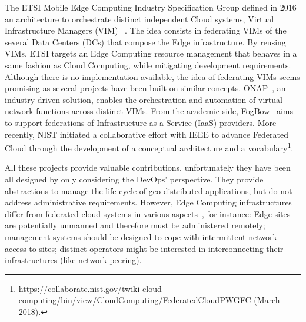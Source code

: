 


%
The ETSI Mobile Edge Computing Industry Specification Group
defined in 2016 an architecture to orchestrate distinct
independent Cloud systems, \aka Virtual
Infrastructure Managers (VIM) ~\cite{7574435}.
%
The idea consists in federating VIMs of the several Data Centers (DCs) that
compose the Edge infrastructure.  By reusing VIMs, ETSI targets an Edge
Computing resource management that behaves in a same fashion as Cloud
Computing, while mitigating development requirements.
%
Although there is no implementation available, the idea of federating
VIMs seems promising as several projects have been built on similar
concepts. ONAP~\cite{onap}, an industry-driven solution,
enables the orchestration and automation of virtual network functions
across distinct VIMs. From the academic side, FogBow~\cite{brasileiro2016fogbow} aims to support federations
of Infrastructure-as-a-Service (IaaS) providers. More recently, NIST
initiated a collaborative effort with IEEE to advance Federated
Cloud through the development of a conceptual architecture and a
vocabulary\footnote{\url{https://collaborate.nist.gov/twiki-cloud-computing/bin/view/CloudComputing/FederatedCloudPWGFC}
  (March 2018).}.

All these projects provide valuable contributions, unfortunately they have
been all designed by only considering the DevOps' perspective. They provide
abstractions to manage the life cycle of geo-distributed applications,
but do not address administrative requirements.
%
However, Edge Computing infrastructures differ from federated cloud systems
in various aspects~\cite{openstack:whitepaper}, for instance: 
Edge sites are potentially unmanned and therefore must be administered remotely; 
management systems should be designed to cope with intermittent network access to sites; distinct operators might be interested in interconnecting their infrastructures (like network peering).
%

